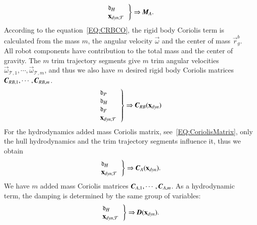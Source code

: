 \begin{align}
\left.\begin{tabular}{l}
 $\mathfrak{d}_{H}$ \\
 $\vec{x}_{dyn,\mathcal{T}}$
\end{tabular}\right\}\Rightarrow \emph{\textbf{M}}_{A}.\label{EQ:DynamikRelationship2}
\end{align} 
According to the equation~\ref{EQ:CRBCO}, the rigid body Coriolis term is calculated from the mass $m$, the angular velocity $\vec{\omega}$ and the center of mass $\vec{r}_{g}^{b}$. All robot components have contribution to  the total mass and the center of gravity. The $m$ trim trajectory segments give $m$ trim angular velocities $\vec{\omega}_{\mathcal{T},1}, \cdots, \vec{\omega}_{\mathcal{T},m}$, and thus we also have $m$ desired rigid body  
Coriolis matrices $\emph{\textbf{C}}_{RB,1}, \cdots, \emph{\textbf{C}}_{RB,m}$.
\begin{align}
\left.\begin{tabular}{l}
$\mathfrak{d}_{P}$ \\
$\mathfrak{d}_{H}$ \\
$\mathfrak{d}_{F}$ \\
$\vec{x}_{dyn,\mathcal{T}}$
\end{tabular}\right\}\Rightarrow \emph{\textbf{C}}_{RB}(\vec{x}_{dyn})
\label{EQ:DynamikRelationship3}
\end{align}
For the hydrodynamics added mass Coriolis matrix, see~\ref{EQ:CoriolisMatrix}, only the hull hydrodynamics and the trim trajectory segments influence it, thus we obtain
\begin{align}
\left.\begin{tabular}{l}
$\mathfrak{d}_{H}$ \\
$\vec{x}_{dyn,\mathcal{T}}$
\end{tabular}\right\}\Rightarrow \emph{\textbf{C}}_{A}(\vec{x}_{dyn}).
\label{EQ:DynamikRelationship4}
\end{align}
We have $m$ added mass Coriolis matrices $\emph{\textbf{C}}_{A,1}, \cdots, \emph{\textbf{C}}_{A,m}$. 
As a hydrodynamic term, the damping is determined by the same group of variables: 
\begin{align}
\left.\begin{tabular}{l}
$\mathfrak{d}_{H}$ \\
$\vec{x}_{dyn,\mathcal{T}}$
\end{tabular}\right\}\Rightarrow \emph{\textbf{D}}(\vec{x}_{dyn}).
\label{EQ:DynamikRelationship5}
\end{align}
